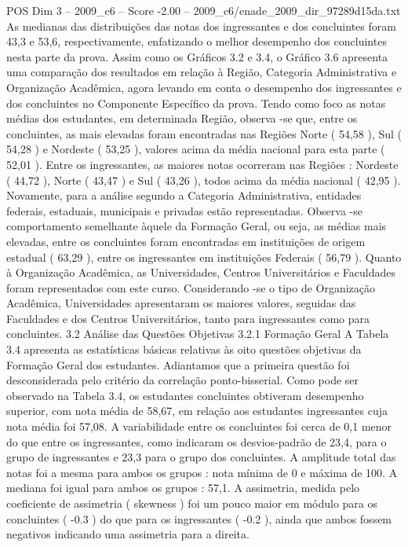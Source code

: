 \begin{textsample}{POS Dim 3 – 2009\_c6 – Score -2.00 – 2009\_c6/enade\_2009\_dir\_97289d15da.txt}
As medianas das distribuições das notas dos ingressantes e dos concluintes foram 43,3 e 53,6, respectivamente, enfatizando o melhor desempenho dos concluintes nesta parte da prova.
Assim como os Gráficos 3.2 e 3.4, o Gráfico 3.6 apresenta uma comparação dos resultados em relação à Região, Categoria Administrativa e Organização Acadêmica, agora levando em conta o desempenho dos ingressantes e dos concluintes no Componente Específico da prova.
Tendo como foco as notas médias dos estudantes, em determinada Região, observa -se que, entre os concluintes, as mais elevadas foram encontradas nas Regiões Norte ( 54,58 ), Sul ( 54,28 ) e Nordeste ( 53,25 ), valores acima da média nacional para esta parte ( 52,01 ).
Entre os ingressantes, as maiores notas ocorreram nas Regiões : Nordeste ( 44,72 ), Norte ( 43,47 ) e Sul ( 43,26 ), todos acima da média nacional ( 42,95 ).
Novamente, para a análise segundo a Categoria Administrativa, entidades federais, estaduais, municipais e privadas estão representadas.
Observa -se comportamento semelhante àquele da Formação Geral, ou seja, as médias mais elevadas, entre os concluintes foram encontradas em instituições de origem estadual ( 63,29 ), entre os ingressantes em instituições Federais ( 56,79 ).
Quanto à Organização Acadêmica, as Universidades, Centros Universitários e Faculdades foram representados com este curso.
Considerando -se o tipo de Organização Acadêmica, Universidades apresentaram os maiores valores, seguidas das Faculdades e dos Centros Universitários, tanto para ingressantes como para concluintes. 3.2 Análise das Questões Objetivas 3.2.1 Formação Geral A Tabela 3.4 apresenta as estatísticas básicas relativas às oito questões objetivas da Formação Geral dos estudantes.
Adiantamos que a primeira questão foi desconsiderada pelo critério da correlação ponto-bisserial.
Como pode ser observado na Tabela 3.4, os estudantes concluintes obtiveram desempenho superior, com nota média de 58,67, em relação aos estudantes ingressantes cuja nota média foi 57,08.
A variabilidade entre os concluintes foi cerca de 0,1 menor do que entre os ingressantes, como indicaram os desvios-padrão de 23,4, para o grupo de ingressantes e 23,3 para o grupo dos concluintes.
A amplitude total das notas foi a mesma para ambos os grupos : nota mínima de 0 e máxima de 100.
A mediana foi igual para ambos os grupos : 57,1.
A assimetria, medida pelo coeficiente de assimetria ( skewness ) foi um pouco maior em módulo para os concluintes ( -0.3 ) do que para os ingressantes ( -0.2 ), ainda que ambos fossem negativos indicando uma assimetria para a direita.

\end{textsample}
